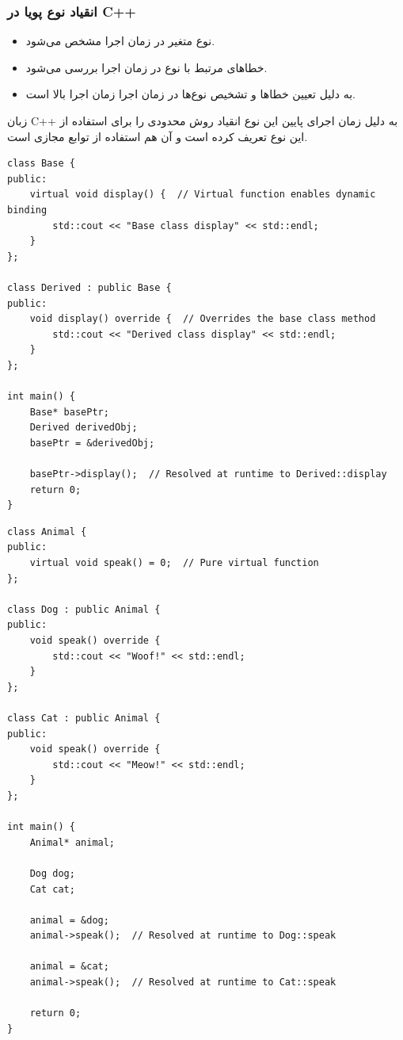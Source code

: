 \documentclass{article}
\begin{document}
\subsubsection*{انقیاد نوع پویا در C++}
\begin{itemize}
    \item نوع متغیر در زمان اجرا مشخص می‌شود.
    \item خطاهای مرتبط با نوع در زمان اجرا بررسی می‌شود.
    \item به دلیل تعیین خطاها و تشخیص نوع‌ها در زمان اجرا زمان اجرا بالا است.
\end{itemize}

زبان C++ به دلیل زمان اجرای پایین این نوع انقیاد روش‌ محدودی را برای استفاده از این نوع تعریف کرده است و آن هم استفاده از توابع مجازی است.

\begin{LTR} %
\begin{lstlisting}
class Base {
public:
    virtual void display() {  // Virtual function enables dynamic binding
        std::cout << "Base class display" << std::endl;
    }
};

class Derived : public Base {
public:
    void display() override {  // Overrides the base class method
        std::cout << "Derived class display" << std::endl;
    }
};

int main() {
    Base* basePtr;
    Derived derivedObj;
    basePtr = &derivedObj;

    basePtr->display();  // Resolved at runtime to Derived::display
    return 0;
}
\end{lstlisting}
\end{LTR}


\begin{LTR} %
\begin{lstlisting}
class Animal {
public:
    virtual void speak() = 0;  // Pure virtual function
};

class Dog : public Animal {
public:
    void speak() override {
        std::cout << "Woof!" << std::endl;
    }
};

class Cat : public Animal {
public:
    void speak() override {
        std::cout << "Meow!" << std::endl;
    }
};

int main() {
    Animal* animal;

    Dog dog;
    Cat cat;

    animal = &dog;
    animal->speak();  // Resolved at runtime to Dog::speak

    animal = &cat;
    animal->speak();  // Resolved at runtime to Cat::speak

    return 0;
}
\end{lstlisting}
\end{LTR}
\end{document}
